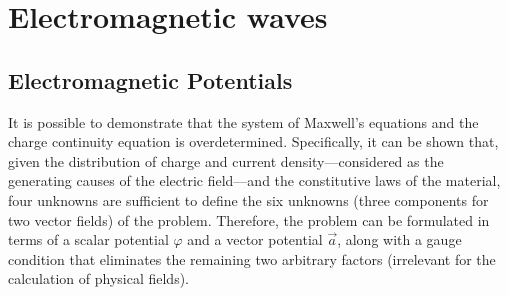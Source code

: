 \documentclass[letterpaper,10pt,english]{jupyterBook}
\begin{document}
\chapter{Electromagnetic waves}
\label{\detokenize{ch/waves:electromagnetic-waves}}\label{\detokenize{ch/waves:classical-electromagnetism-waves}}\label{\detokenize{ch/waves::doc}}
\sphinxstepscope




\section{Electromagnetic Potentials}
\label{\detokenize{ch/potentials:electromagnetic-potentials}}\label{\detokenize{ch/potentials:classical-electromagnetism-potentials}}\label{\detokenize{ch/potentials::doc}}
\sphinxAtStartPar
It is possible to demonstrate that the system of Maxwell’s equations and the charge continuity equation is overdetermined. Specifically, it can be shown that, given the distribution of charge and current density—considered as the generating causes of the electric field—and the constitutive laws of the material, four unknowns are sufficient to define the six unknowns (three components for two vector fields) of the problem. Therefore, the problem can be formulated in terms of a scalar potential \(\varphi\) and a vector potential \(\vec{a}\), along with a gauge condition that eliminates the remaining two arbitrary factors (irrelevant for the calculation of physical fields).
\end{document}
